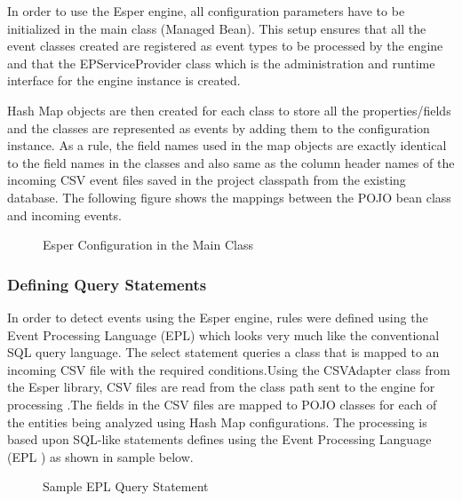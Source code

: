 \noindent In order to use the Esper engine, all configuration parameters have to be initialized in the main class (Managed Bean). This setup ensures that all the event classes created are registered as event types to be processed by the engine and that the EPServiceProvider class which is the administration and runtime interface for the engine instance is created.

\noindent Hash Map objects are then created for each class to store all the properties/fields and the classes are represented as events by adding them to the configuration instance. As a rule, the field names used in the map objects are exactly identical to the field names in the classes and also same as the column header names of the incoming CSV event files saved in the project classpath from the existing database. The following figure shows the mappings between the POJO bean class and incoming events.

\begin{center}
\begin{figure}[h]
\caption{Esper Configuration in the Main Class}

\end{figure}
\end{center}


\subsubsection{Defining Query Statements}

\noindent In order to detect events using the Esper engine, rules were defined using the Event Processing Language (EPL) which looks very much like the conventional SQL query language. The select statement queries a class that is mapped to an incoming CSV file with the required conditions.Using the CSVAdapter  class from the Esper \cite{twentyfive} library, CSV files are read from the class path sent to the engine for processing .The fields in the CSV files are mapped to POJO classes for each of the entities being  analyzed using Hash Map configurations. The processing is based upon SQL-like statements defines using the Event Processing Language (EPL ) \cite{four} as shown in sample below.

\begin{center}
\begin{figure}[h]
\caption{Sample EPL Query Statement }

\end{figure}
\end{center}

